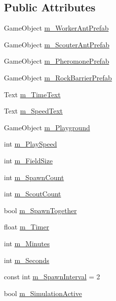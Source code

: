 \subsection*{Public Attributes}
\begin{DoxyCompactItemize}
\item 
Game\+Object \mbox{\hyperlink{class_colony_manager_a212b62df0cbb2542a0f8c8d236fc05c1}{m\+\_\+\+Worker\+Ant\+Prefab}}
\item 
Game\+Object \mbox{\hyperlink{class_colony_manager_a4c10c136ddfacc7fb51ac1c03b78527b}{m\+\_\+\+Scouter\+Ant\+Prefab}}
\item 
Game\+Object \mbox{\hyperlink{class_colony_manager_aad81ec03aeadc9050f42053297dd538c}{m\+\_\+\+Pheromone\+Prefab}}
\item 
Game\+Object \mbox{\hyperlink{class_colony_manager_a86ffaaf3151be5a4e0af047fd7a88000}{m\+\_\+\+Rock\+Barrier\+Prefab}}
\item 
Text \mbox{\hyperlink{class_colony_manager_ad05ba67214be3ce0c73ae43e1326c9a9}{m\+\_\+\+Time\+Text}}
\item 
Text \mbox{\hyperlink{class_colony_manager_aa13a1457d3d548608f9ab1ec16651e36}{m\+\_\+\+Speed\+Text}}
\item 
Game\+Object \mbox{\hyperlink{class_colony_manager_aebca693e999e2ed6f98b5ee49d92d36b}{m\+\_\+\+Playground}}
\item 
int \mbox{\hyperlink{class_colony_manager_aa3c81650f4fa7a277c3177726fc7a0ce}{m\+\_\+\+Play\+Speed}}
\item 
int \mbox{\hyperlink{class_colony_manager_a4c0db188b26b046e2eaf3d6301b0a220}{m\+\_\+\+Field\+Size}}
\item 
int \mbox{\hyperlink{class_colony_manager_a4269fd8cb9d7a5a50a9812395ddd9a0f}{m\+\_\+\+Spawn\+Count}}
\item 
int \mbox{\hyperlink{class_colony_manager_a46c3a0cd638a0a7a64768804135db155}{m\+\_\+\+Scout\+Count}}
\item 
bool \mbox{\hyperlink{class_colony_manager_ac35585a7456b5cbd36e848c54a89e369}{m\+\_\+\+Spawn\+Together}}
\item 
float \mbox{\hyperlink{class_colony_manager_aabfcf20e0ca22cce63219e5a3068a0a7}{m\+\_\+\+Timer}}
\item 
int \mbox{\hyperlink{class_colony_manager_a7449b4e922fd4c73fe921bb10f2e425b}{m\+\_\+\+Minutes}}
\item 
int \mbox{\hyperlink{class_colony_manager_a2fc2a7f6a1fcf7b930107a009ded572f}{m\+\_\+\+Seconds}}
\item 
const int \mbox{\hyperlink{class_colony_manager_a9721f5be7706bcc79ffc1960c65ce38d}{m\+\_\+\+Spawn\+Interval}} = 2
\item 
bool \mbox{\hyperlink{class_colony_manager_a455239e3cba006873cf5a5c6dd8daa20}{m\+\_\+\+Simulation\+Active}}
\end{DoxyCompactItemize}


